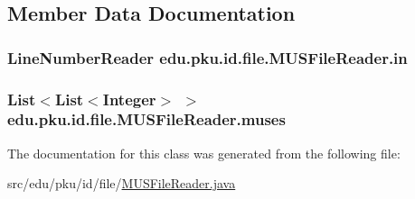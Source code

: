 \subsection{Member Data Documentation}
\hypertarget{classedu_1_1pku_1_1id_1_1file_1_1_m_u_s_file_reader_af176cb943376789226dd691f24f6c2e6}{
\subsubsection[{in}]{\setlength{\rightskip}{0pt plus 5cm}LineNumberReader {\bf edu.pku.id.file.MUSFileReader.in}}}
\label{classedu_1_1pku_1_1id_1_1file_1_1_m_u_s_file_reader_af176cb943376789226dd691f24f6c2e6}
\hypertarget{classedu_1_1pku_1_1id_1_1file_1_1_m_u_s_file_reader_ae7598813fc97a674c9dfdc50f79f1d52}{
\subsubsection[{muses}]{\setlength{\rightskip}{0pt plus 5cm}List$<$List$<$Integer$>$ $>$ {\bf edu.pku.id.file.MUSFileReader.muses}}}
\label{classedu_1_1pku_1_1id_1_1file_1_1_m_u_s_file_reader_ae7598813fc97a674c9dfdc50f79f1d52}


The documentation for this class was generated from the following file:\begin{DoxyCompactItemize}
\item 
src/edu/pku/id/file/\hyperlink{_m_u_s_file_reader_8java}{MUSFileReader.java}\end{DoxyCompactItemize}
